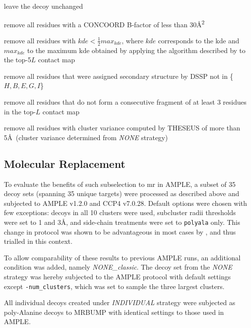 \begin{description}[style=multiline,leftmargin=3cm]
    \item[default] leave the decoy unchanged
    \item[bfactor] remove all residues with a CONCOORD \cite{De_Groot1997-gb} B-factor of less than 30\AA\textsuperscript{2}
    \item[domain] remove all residues with $kde<\frac{1}{2}max_{kde}$, where $kde$ corresponds to the \gls{kde} and $max_{kde}$ to the maximum \gls{kde} obtained by applying the algorithm described by \textcite{Sadowski2013-zu} to the top-5$L$ contact map
    \item[dssp] remove all residues that were assigned secondary structure by DSSP \cite{Frishman1995-si} not in \{$H, B, E, G, I$\}
    \item[residue] remove all residues that do not form a consecutive fragment of at least 3 residues in the top-$L$ contact map
    \item[variance] remove all residues with cluster variance computed by THESEUS \cite{Theobald2006-qj} of more than 5\AA\ (cluster variance determined from \textit{NONE} strategy)
\end{description}

\subsection{Molecular Replacement} \label{subsec:ample_decoys_methods_mr}
To evaluate the benefits of such subselection to \gls{mr} in AMPLE, a subset of 35 decoy sets (spanning 35 unique targets) were processed as described above and subjected to AMPLE v1.2.0 and CCP4 v7.0.28. Default options were chosen with few exceptions: decoys in all 10 clusters were used, subcluster radii thresholds were set to 1 and 3\AA, and side-chain treatments were set to \texttt{polyala} only. This change in protocol was shown to be advantageous in most cases by \textcite{Thomas2017-qu}, and thus trialled in this context. 

To allow comparability of these results to previous AMPLE runs, an additional condition was added, namely \textit{NONE\_classic}. The decoy set from the \textit{NONE} strategy was hereby subjected to the AMPLE protocol with default settings except \texttt{-num\_clusters}, which was set to sample the three largest clusters.

All individual decoys created under \textit{INDIVIDUAL} strategy were subjected as poly-Alanine decoys to MRBUMP \cite{Keegan2018-kn} with identical settings to those used in AMPLE. 

